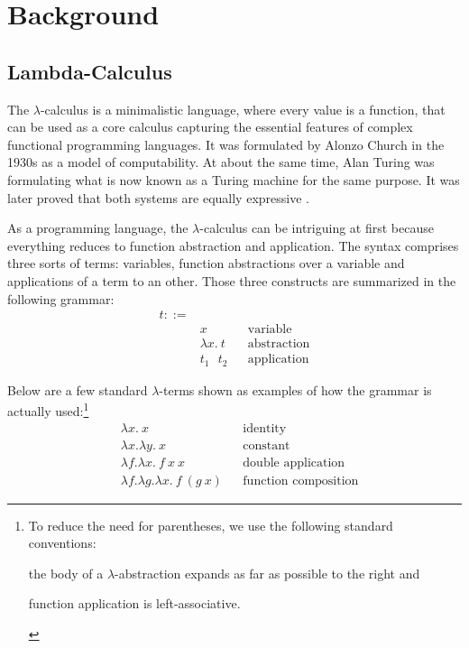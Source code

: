 \section{Background}
\label{sec:background}

\subsection{Lambda-Calculus}
\label{sec:background-lambda-calculus}

The $\lambda$-calculus is a minimalistic language, where every value is a function, that can be used
as a core calculus capturing the essential features of complex functional programming languages. It
was formulated by Alonzo Church \cite{church-1936-unsolvable-problem} in the 1930s as a model of
computability. At about the same time, Alan Turing was formulating what is now known as a Turing
machine \cite{turing-1936-on-computable-numbers} for the same purpose. It was later proved that both
systems are equally expressive \cite{turing-1937-computability}.

As a programming language, the $\lambda$-calculus can be intriguing at first because everything
reduces to function abstraction and application. The syntax comprises three sorts of terms:
variables, function abstractions over a variable and applications of a term to an other. Those three
constructs are summarized in the following grammar:
\begin{align*}
  t ::= & \\
    & x && \text{variable} \\
    & \lambda x. \ t && \text{abstraction} \\
    & t_1 \text{ } t_2 && \text{application}
\end{align*}

Below are a few standard $\lambda$-terms shown as examples of how the grammar is actually
used:\footnote{To reduce the need for parentheses, we use the following standard conventions:
\begin{enumerate*}[label=(\arabic*)]
  \item the body of a $\lambda$-abstraction expands as far as possible to the right and
  \item function application is left-associative.
\end{enumerate*}}
\begin{align*}
  & \lambda x. \ x && \text{identity} \\
  & \lambda x. \lambda y. \ x && \text{constant} \\
  & \lambda f. \lambda x. \ f \ x \ x && \text{double application} \\
  & \lambda f. \lambda g. \lambda x. \ f \ (g \ x) && \text{function composition}
\end{align*}

